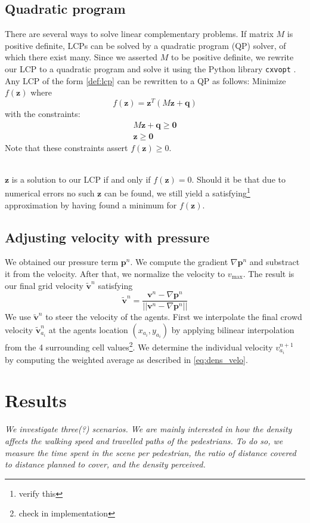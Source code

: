 \documentclass{article}
\let\oldtil\tilde
\renewcommand{\vec}[1]{\mathbf{#1}}
\renewcommand{\tilde}[1]{\oldtil{\mathbf{#1}}}
\begin{document}
\subsection{Quadratic program}
There are several ways to solve linear complementary problems. If  matrix $M$ is positive definite, LCPs can be solved by a quadratic program (QP) solver, of which there exist many. Since we asserted $M$ to be positive definite, we rewrite our LCP to a quadratic program and solve it using the Python library \texttt{cxvopt} \cite{cvxopt}.
\ \\
Any LCP of the form \eqref{def:lcp} can be rewritten to a QP as follows: Minimize $f(\vec{z})$ where
\begin{equation}
	f(\vec{z}) = \vec{z}^T\left( M\vec{z}+\vec{q} \right)
\end{equation}
with the constraints:
\begin{align}
	M\vec{z} + \vec{q}\geq\vec{0}\\
	\vec{z}\geq\vec{0}
\end{align}
Note that these constraints assert $f(\vec{z}) \geq 0$. 

\ \\
$\vec{z}$ is a solution to our LCP if and only if $f(\vec{z})=0$. Should it be that due to numerical errors no such $\vec{z}$ can be found, we still yield a satisfying\footnote{verify this} approximation by having found a minimum for $f(\vec{z})$.
\subsection{Adjusting velocity with pressure}
We obtained our pressure term $\vec{p}^n$. We compute the gradient $\nabla\vec{p}^n$ and substract it from the velocity. After that, we normalize the velocity to $v_{\max}$.
The result is our final grid velocity $\tilde{v}^n$ satisfying
\begin{equation}
	\tilde{v}^n = \frac{\vec{v}^n-\nabla\vec{p}^n}{||\vec{v}^n-\nabla\vec{p}^n||}
	\label{eq:finvelocity}
\end{equation}
We use $\tilde{v}^n$ to steer the velocity of the agents. First we interpolate the final crowd velocity $\tilde{v}^n_{a_i}$ at the agents location $(x_{a_i},y_{a_i})$ by applying bilinear interpolation from the 4 surrounding cell values\footnote{check in implementation}. We determine the individual velocity $v^{n+1}_{a_i}$ by computing the weighted average as described in \eqref{eq:dens_velo}.
\newpage
\section{Results}
\emph{We investigate three(?) scenarios. We are mainly interested in how the density affects the walking speed and travelled paths of the pedestrians. To do so, we measure the time spent in the scene per pedestrian, the ratio of distance covered to distance planned to cover, and the density perceived.}

 
\end{document}
